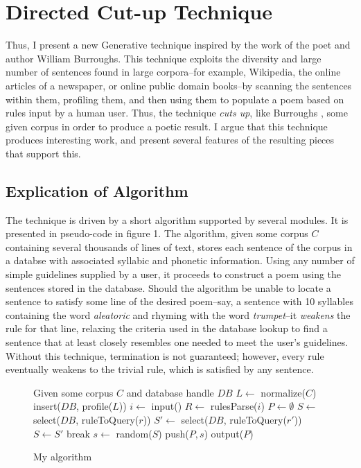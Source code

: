 \documentclass[10pt]{article}
\begin{document}
\section{Directed Cut-up Technique}
Thus, I present a new Generative technique inspired by the work of the poet and
author William Burroughs. This technique exploits the diversity and large
number of sentences found in large corpora--for example, Wikipedia, the online
articles of a newspaper, or online public domain books--by scanning the
sentences within them, profiling them, and then using them to populate a poem
based on rules input by a human user. Thus, the technique \emph{cuts up}, like
Burroughs \cite{wikiCutup}, some given corpus in order to produce a poetic
result. I argue that this technique produces interesting work, and present
several features of the resulting pieces that support this.

\subsection{Explication of Algorithm}
The technique is driven by a short algorithm  supported by several modules. It
is presented in pseudo-code in figure 1. The algorithm, given some corpus $C$
containing several thousands of lines of text, stores each sentence of the
corpus in a databse with associated syllabic and phonetic information. Using
any number of simple guidelines supplied by a user, it proceeds to construct a
poem using the sentences stored in the database. Should the algorithm be unable
to locate a sentence to satisfy some line of the desired poem--say, a sentence with
10 syllables containing the word \emph{aleatoric} and rhyming with the word
\emph{trumpet}--it \emph{weakens} the rule for that line, relaxing the criteria
used in the database lookup to find a sentence that at least closely resembles
one needed to meet the user's guidelines. Without this technique, termination
is not guaranteed; however, every rule eventually weakens to the trivial rule,
which is satisfied by any sentence.

\pagebreak
\onehalfspacing
\begin{figure}[here]
\begin{algorithmic}
\STATE Given some corpus $C$ and database handle $DB$
\STATE $L\gets$ normalize($C$)
\STATE insert($DB$, profile($L$))
\STATE $i \gets$ input()
\STATE $R \gets$ rulesParse($i$)
\STATE $P \gets \emptyset$
    \STATE $S \gets$ select($DB$, ruleToQuery($r$))
            \STATE $S\prime \gets$ select($DB$, ruleToQuery($r\prime$))
                \STATE $S \gets S\prime$
                \STATE break
            \ENDIF
        \ENDWHILE
    \ENDIF
    \STATE $s \gets$ random($S$)
    \STATE push($P, s$)
\ENDFOR
\STATE output($P$)
\end{algorithmic}
\caption{My algorithm}
\label{fig:algorithm}
\end{figure}
\doublespacing
\end{document}
